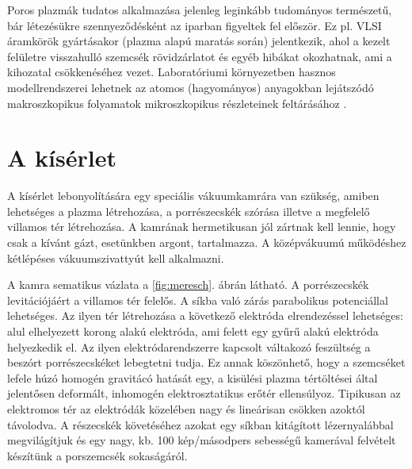         Poros plazmák tudatos alkalmazása jelenleg leginkább
           tudományos természetű, bár létezésükre szennyeződésként
           az iparban figyeltek fel először. Ez pl. VLSI áramkörök gyártásakor
           (plazma alapú maratás során) jelentkezik, ahol a kezelt
           felületre visszahulló szemcsék rövidzárlatot és egyéb
           hibákat okozhatnak, ami a kihozatal csökkenéséhez
	vezet. Laboratóriumi környezetben hasznos modellrendszerei
        lehetnek az atomos (hagyományos) anyagokban lejátszódó
        makroszkopikus folyamatok mikroszkopikus részleteinek
        feltárásához \cite{Garmisch}. 

\section{A kísérlet}

	A kísérlet lebonyolítására egy speciális vákuumkamrára van szükség, amiben lehetséges a plazma
	létrehozása, a porrészecskék szórása illetve a megfelelő villamos tér létrehozása.
	A kamrának hermetikusan jól zártnak kell lennie, hogy csak a
        kívánt gázt, esetünkben argont, tartalmazza.
	A középvákuumú működéshez kétlépéses vákuumszivattyút kell alkalmazni.
		
	A kamra sematikus vázlata a \ref{fig:meresch}. ábrán látható.
	A porrészecskék levitációjáért a villamos tér felelős. A síkba való zárás parabolikus
	potenciállal lehetséges. Az ilyen tér létrehozása a következő elektróda elrendezéssel lehetséges:
	alul elhelyezett korong alakú elektróda, ami felett egy gyűrű alakú elektróda helyezkedik el.
	Az ilyen elektródarendszerre kapcsolt váltakozó feszültség a beszórt porrészecskéket lebegtetni
	tudja. Ez annak köszönhető, hogy a szemcséket lefele húzó
        homogén gravitácó hatását egy, a kisülési plazma tértöltései
        által jelentősen deformált, inhomogén elektrosztatikus erőtér
        ellensúlyoz. Tipikusan az elektromos tér az elektródák
        közelében nagy és lineárisan csökken azoktól távolodva. 
        A részecskék követéséhez azokat egy síkban kitágított
        lézernyalábbal megvilágítjuk és egy nagy, kb. 100 kép/másodpers sebességű kamerával
	felvételt készítünk a porszemcsék sokaságáról.
	
